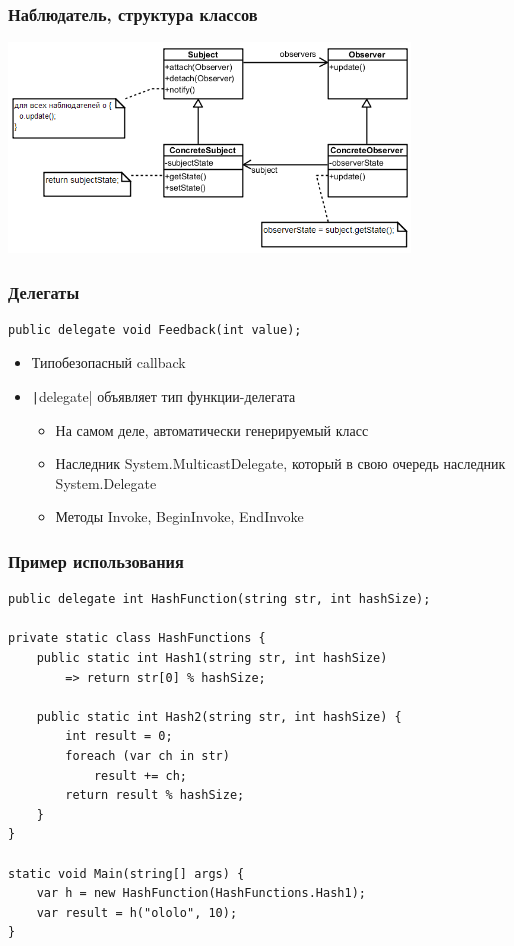 \documentclass{../../slides-style}
\begin{document}
    \begin{frame}
        \frametitle{Наблюдатель, структура классов}
        \begin{center}
            \includegraphics[width=0.8\textwidth]{observer.png}
        \end{center}
    \end{frame}

    \begin{frame}[fragile]
        \frametitle{Делегаты}
        \begin{verbatim}
public delegate void Feedback(int value);
        \end{verbatim}
        \begin{itemize}
            \item Типобезопасный callback
            \item \texttt|delegate| объявляет тип функции-делегата
            \begin{itemize}
                \item На самом деле, автоматически генерируемый класс
                \item Наследник System.MulticastDelegate, который в свою очередь наследник System.Delegate
                \item Методы Invoke, BeginInvoke, EndInvoke
            \end{itemize}
        \end{itemize}
    \end{frame}

    \begin{frame}[fragile]
        \frametitle{Пример использования}
        \begin{scriptsize}
            \begin{verbatim}
public delegate int HashFunction(string str, int hashSize);

private static class HashFunctions {
    public static int Hash1(string str, int hashSize)
        => return str[0] % hashSize;

    public static int Hash2(string str, int hashSize) {
        int result = 0;
        foreach (var ch in str)
            result += ch;
        return result % hashSize;
    }
}

static void Main(string[] args) {
    var h = new HashFunction(HashFunctions.Hash1);
    var result = h("ololo", 10);
}
            \end{verbatim}
        \end{scriptsize}
    \end{frame}
\end{document}
